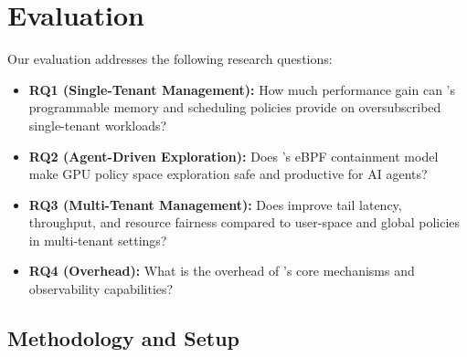 \section{Evaluation}
\label{sec:eval}

Our evaluation addresses the following research questions:

\begin{itemize}[leftmargin=*]
  \item \textbf{RQ1 (Single-Tenant Management):} How much performance gain can \sys's programmable memory and scheduling policies provide on oversubscribed single-tenant workloads?
  \item \textbf{RQ2 (Agent-Driven Exploration):} Does \sys's eBPF containment model make GPU policy space exploration safe and productive for AI agents?
  \item \textbf{RQ3 (Multi-Tenant Management):} Does \sys improve tail latency, throughput, and resource fairness compared to user-space and global policies in multi-tenant settings?
  \item \textbf{RQ4 (Overhead):} What is the overhead of \sys{}'s core mechanisms and observability capabilities?
\end{itemize}


\subsection{Methodology and Setup}

